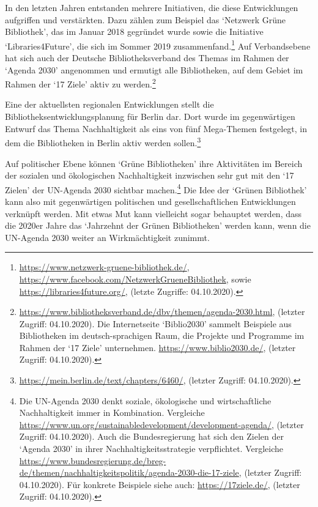 \documentclass[a4paper,
fontsize=11pt,
oneside,
numbers=noperiodatend,
parskip=half-,
bibliography=totoc,
final
]{scrartcl}
\begin{document}
In den letzten Jahren entstanden mehrere Initiativen, die diese
Entwicklungen aufgriffen und verstärkten. Dazu zählen zum Beispiel das
\enquote*{Netzwerk Grüne Bibliothek}, das im Januar 2018 gegründet wurde
sowie die Initiative \enquote*{Libraries4Future}, die sich im Sommer
2019 zusammenfand.\footnote{\url{https://www.netzwerk-gruene-bibliothek.de/},
  \url{https://www.facebook.com/NetzwerkGrueneBibliothek}, sowie
  \url{https://libraries4future.org/}, (letzte Zugriffe: 04.10.2020).}
Auf Verbandsebene hat sich auch der Deutsche Bibliotheksverband des
Themas im Rahmen der \enquote*{Agenda 2030} angenommen und ermutigt alle
Bibliotheken, auf dem Gebiet im Rahmen der \enquote*{17 Ziele} aktiv zu
werden.\footnote{\url{https://www.bibliotheksverband.de/dbv/themen/agenda-2030.html},
  (letzter Zugriff: 04.10.2020). Die Internetseite \enquote*{Biblio2030}
  sammelt Beispiele aus Bibliotheken im deutsch-sprachigen Raum, die
  Projekte und Programme im Rahmen der \enquote*{17 Ziele} unternehmen.
  \url{https://www.biblio2030.de/}, (letzter Zugriff: 04.10.2020).}

Eine der aktuellsten regionalen Entwicklungen stellt die
Bibliotheksentwicklungsplanung für Berlin dar. Dort wurde im
gegenwärtigen Entwurf das Thema Nachhaltigkeit als eins von fünf
Mega-Themen festgelegt, in dem die Bibliotheken in Berlin aktiv werden
sollen.\footnote{\url{https://mein.berlin.de/text/chapters/6460/},
  (letzter Zugriff: 04.10.2020).}

Auf politischer Ebene können \enquote*{Grüne Bibliotheken} ihre
Aktivitäten im Bereich der sozialen und ökologischen Nachhaltigkeit
inzwischen sehr gut mit den \enquote*{17 Zielen} der UN-Agenda 2030
sichtbar machen.\footnote{Die UN-Agenda 2030 denkt soziale, ökologische
  und wirtschaftliche Nachhaltigkeit immer in Kombination. Vergleiche
  \url{https://www.un.org/sustainabledevelopment/development-agenda/},
  (letzter Zugriff: 04.10.2020). Auch die Bundesregierung hat sich den
  Zielen der \enquote*{Agenda 2030} in ihrer Nachhaltigkeitsstrategie
  verpflichtet. Vergleiche
  \url{https://www.bundesregierung.de/breg-de/themen/nachhaltigkeitspolitik/agenda-2030-die-17-ziele},
  (letzter Zugriff: 04.10.2020). Für konkrete Beispiele siehe auch:
  \url{https://17ziele.de/}, (letzter Zugriff: 04.10.2020).} Die Idee
der \enquote*{Grünen Bibliothek} kann also mit gegenwärtigen politischen
und gesellschaftlichen Entwicklungen verknüpft werden. Mit etwas Mut
kann vielleicht sogar behauptet werden, dass die 2020er Jahre das
\enquote*{Jahrzehnt der Grünen Bibliotheken} werden kann, wenn die
UN-Agenda 2030 weiter an Wirkmächtigkeit zunimmt.
\end{document}
